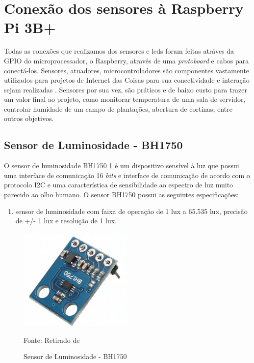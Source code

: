 \documentclass[../../layout.tex]{subfiles}
\begin{document}
\section{Conexão dos sensores à Raspberry Pi 3B+}
\hspace*{3em}Todas as conexões que realizamos dos sensores e leds foram feitas atráves da GPIO do microprocessador, o Raspberry, através de uma \emph{protoboard} e cabos para conectá-los.
\hspace*{3em}Sensores, atuadores, microcontroladores são componentes vastamente utilizados para projetos de Internet das Coisas para sua conectividade e interação sejam realizadas \cite{sensores_iot}. Sensores por sua vez, são práticos e de baixo custo para trazer um valor final ao projeto, como monitorar temperatura de uma sala de servidor, controlar humidade de um campo de plantações, abertura de cortinas, entre outros objetivos.
\subsection{Sensor de Luminosidade - BH1750}
\hspace*{3em}O sensor de luminosidade BH1750 \ref{fig:BH1750} é um dispositivo sensível à luz que possui uma interface de comunicação 16 \emph{bits} e interface de comunicação de acordo com o protocolo I2C e uma característica de sensibilidade ao espectro de luz muito parecido ao olho humano.
\hspace*{3em}O sensor BH1750 possui as seguintes especificações:
\begin{enumerate}[label=\alph*)]
\itemsep0em
    \item sensor de luminosidade com faixa de operação de 1 lux a 65.535 lux, precisão de +/- 1 lux e resolução de 1 lux.
\end{enumerate}

\begin{figure}[H]
\centering
\caption{Sensor de Luminosidade - BH1750}
\includegraphics[width=0.5\textwidth]{assets/static/img/BH1750.jpg}
\label{fig:BH1750}

\begin{minipage}{0.5\textwidth}
\raggedright \footnotesize Fonte: Retirado de \cite{BH1750} 
\end{minipage}
\end{figure}
\end{document}
